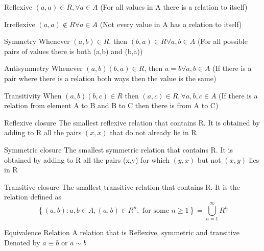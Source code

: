 \documentclass[grid,avery5371]{flashcards}
\begin{document}
\begin{flashcard}[]{Reflexive}
	$(a,a)\in R, \forall a\in A$ (For all values in A there is a relation to itself)
\end{flashcard}

\begin{flashcard}[]{Irreflexive}
	$(a,a)\notin R\forall a \in A$ (Not every value in A has a relation to itself)
\end{flashcard}

\begin{flashcard}[]{Symmetry}
	Whenever $(a,b)\in R$, then $(b,a)\in R \forall a,b \in A$ (For all possible pairs of values there is both (a,b) and (b,a))
\end{flashcard}


\begin{flashcard}[]{Antisymmetry}
	Whenever $(a,b)(b,a)\in R$, then $a=b \forall a,b\in A$ (If there is a pair where there is a relation both ways then the value is the same)
\end{flashcard}

\begin{flashcard}[]{Transitivity}
	When $(a,b)(b,c)\in R$ then $(a,c)\in R, \forall a,b,c\in A$ (If there is a relation from element A to B and B to C then there is from A to C)
\end{flashcard}

\begin{flashcard}[]{Reflexive closure}
	The smallest reflexive relation that contains R. It is obtained by adding to R all the pairs $(x,x)$ that do not already lie in R
\end{flashcard}

\begin{flashcard}[]{Symmetric closure}
	The smallest symmetric relation that contains R. It is obtained by adding to R all the pairs (x,y) for which $(y,x)$ but not $(x,y)$ lies in R
\end{flashcard}

\begin{flashcard}[]{Transitive closure}
	The smallest transitive relation that contains R. It is the relation defined as
	{\small
	\[
	\left\{(a, b) : a, b \in A,(a, b) \in R^{n}, \text { for some } n \geq 1\right\}=\bigcup_{n=1}^{\infty} R^{n}
	\]}
\end{flashcard}

\begin{flashcard}[]{Equivalence Relation}
	A relation that is Reflexive, symmetric and transitive\\
	Denoted by $a\equiv b$ or $a\sim b$
\end{flashcard}
\end{document}
